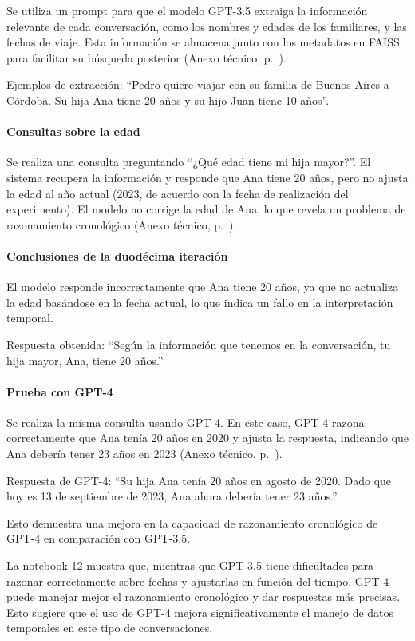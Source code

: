 Se utiliza un prompt para que el modelo GPT-3.5 extraiga la información relevante de cada conversación, como los nombres y edades de los familiares, y las fechas de viaje. Esta información se almacena junto con los metadatos en FAISS para facilitar su búsqueda posterior (Anexo técnico, p.~\pageref{anexo:code-4-1-12-3}).

Ejemplos de extracción:
``Pedro quiere viajar con su familia de Buenos Aires a Córdoba. Su hija Ana tiene 20 años y su hijo Juan tiene 10 años''.

\paragraph{Consultas sobre la edad}

Se realiza una consulta preguntando ``¿Qué edad tiene mi hija mayor?''. El sistema recupera la información y responde que Ana tiene 20 años, pero no ajusta la edad al año actual (2023, de acuerdo con la fecha de realización del experimento). El modelo no corrige la edad de Ana, lo que revela un problema de razonamiento cronológico (Anexo técnico, p.~\pageref{anexo:code-4-1-12-4}).

\paragraph{Conclusiones de la duodécima iteración}

El modelo responde incorrectamente que Ana tiene 20 años, ya que no actualiza la edad basándose en la fecha actual, lo que indica un fallo en la interpretación temporal.

Respuesta obtenida: ``Según la información que tenemos en la conversación, tu hija mayor, Ana, tiene 20 años.''

\paragraph{Prueba con GPT-4}

Se realiza la misma consulta usando GPT-4. En este caso, GPT-4 razona correctamente que Ana tenía 20 años en 2020 y ajusta la respuesta, indicando que Ana debería tener 23 años en 2023 (Anexo técnico, p.~\pageref{anexo:code-4-1-12-5}).

Respuesta de GPT-4: ``Su hija Ana tenía 20 años en agosto de 2020. Dado que hoy es 13 de septiembre de 2023, Ana ahora debería tener 23 años.''

Esto demuestra una mejora en la capacidad de razonamiento cronológico de GPT-4 en comparación con GPT-3.5.

La notebook 12 muestra que, mientras que GPT-3.5 tiene dificultades para razonar correctamente sobre fechas y ajustarlas en función del tiempo, GPT-4 puede manejar mejor el razonamiento cronológico y dar respuestas más precisas. Esto sugiere que el uso de GPT-4 mejora significativamente el manejo de datos temporales en este tipo de conversaciones. 